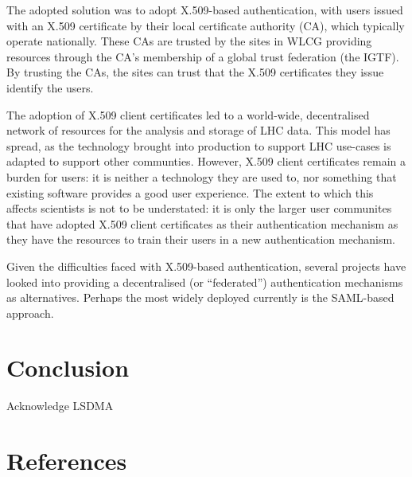 \documentclass[a4paper]{jpconf}
\begin{document}
The adopted solution was to adopt X.509-based authentication, with
users issued with an X.509 certificate by their local certificate
authority (CA), which typically operate nationally.  These CAs are
trusted by the sites in WLCG providing resources through the CA's
membership of a global trust federation (the IGTF).  By trusting the
CAs, the sites can trust that the X.509 certificates they issue
identify the users.

The adoption of X.509 client certificates led to a world-wide,
decentralised network of resources for the analysis and storage of LHC
data.  This model has spread, as the technology brought into
production to support LHC use-cases is adapted to support other
communties.  However, X.509 client certificates remain a burden for
users: it is neither a technology they are used to, nor something that
existing software provides a good user experience.  The extent to
which this affects scientists is not to be understated: it is only the
larger user communites that have adopted X.509 client certificates as
their authentication mechanism as they have the resources to train
their users in a new authentication mechanism.

Given the difficulties faced with X.509-based authentication, several
projects have looked into providing a decentralised (or ``federated'')
authentication mechanisms as alternatives.  Perhaps the most widely
deployed currently is the SAML-based approach.

\section{Conclusion}

\ack

Acknowledge LSDMA

\section*{References}

\end{document}
